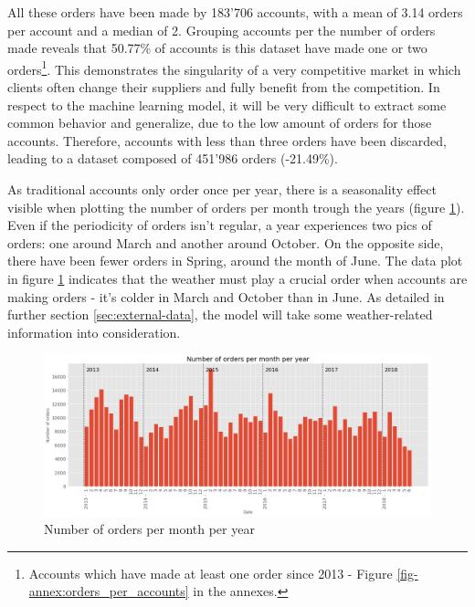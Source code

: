 All these orders have been made by 183'706 accounts, with a mean of 3.14 orders per account and a median of 2. Grouping accounts per the number of orders made reveals that 50.77\% of accounts is this dataset have made one or two orders\footnote{Accounts which have made at least one order since 2013 - Figure \ref{fig-annex:orders_per_accounts} in the annexes.}. This demonstrates the singularity of a very competitive market in which clients often change their suppliers and fully benefit from the competition. In respect to the machine learning model, it will be very difficult to extract some common behavior and generalize, due to the low amount of orders for those accounts. Therefore, accounts with less than three orders have been discarded, leading to a dataset composed of 451'986 orders (-21.49\%).

As traditional accounts only order once per year, there is a seasonality effect visible when plotting the number of orders per month trough the years (figure \ref{fig:order_per_monthyear}). Even if the periodicity of orders isn't regular, a year experiences two pics of orders: one around March and another around October. On the opposite side, there have been fewer orders in Spring, around the month of June. The data plot in figure \ref{fig:order_per_monthyear} indicates that the weather must play a crucial order when accounts are making orders - it's colder in March and October than in June. As detailed in further section \ref{sec:external-data}, the model will take some weather-related information into consideration.

\begin{figure}[h]
    \centering
    \includegraphics[width=15cm]{images/order_month_year.png}
    \caption{Number of orders per month per year}
    \label{fig:order_per_monthyear}
\end{figure}


